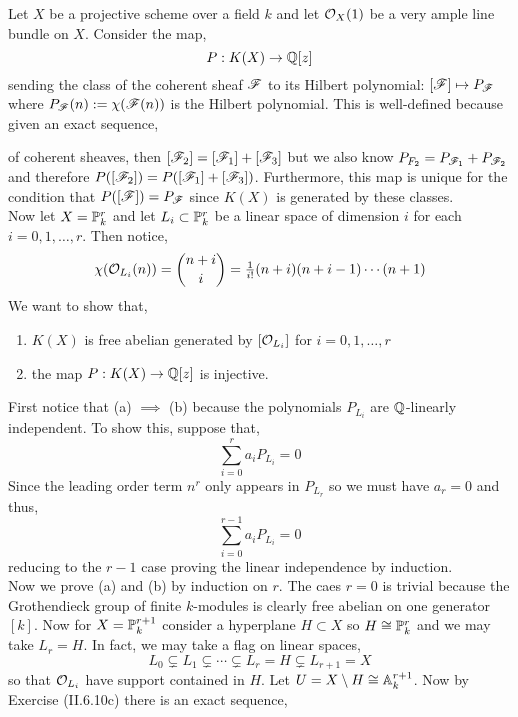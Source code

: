 \documentclass[12pt]{article}
\begin{document}
Let $X$ be a projective scheme over a field $k$ and let $\struct{X}(1)$ be a very ample line bundle on $X$. Consider the map,
\[ P : K(X) \to \Q[z] \]
sending the class of the coherent sheaf $\F$ to its Hilbert polynomial: $[\F] \mapsto P_\F$ where $P_\F(n) := \chi(\F(n))$ is the Hilbert polynomial. This is well-defined because given an exact sequence,
\begin{center}
\end{center}
of coherent sheaves, then $[\F_2] = [\F_1] + [\F_3]$ but we also know $P_{F_2} = P_{\F_1} + P_{\F_2}$ and therefore $P([\F_2]) = P([\F_1] + [\F_3])$. Furthermore, this map is unique for the condition that $P([\F]) = P_\F$ since $K(X)$ is generated by these classes.
\bigskip\\
Now let $X = \P^r_k$ and let $L_i \subset \P^r_k$ be a linear space of dimension $i$ for each $i = 0,1, \dots, r$. Then notice,
\[ \chi(\struct{L_i}(n)) = {n + i \choose i} = \tfrac{1}{i!} (n + i)(n + i - 1) \cdots (n + 1) \]
We want to show that,
\begin{enumerate}
\item $K(X)$ is free abelian generated by $[\struct{L_i}]$ for $i = 0,1,\dots,r$
\item the map $P : K(X) \to \Q[z]$ is injective.
\end{enumerate}
First notice that (a) $\implies$ (b) because the polynomials $P_{L_i}$ are $\Q$-linearly independent. To show this, suppose that,
\[ \sum_{i = 0}^r a_i P_{L_i} = 0 \]
Since the leading order term $n^r$ only appears in $P_{L_r}$ so we must have $a_r = 0$ and thus,
\[ \sum_{i = 0}^{r-1} a_i P_{L_i} = 0 \]
reducing to the $r - 1$ case proving the linear independence by induction. 
\bigskip\\
Now we prove (a) and (b) by induction on $r$. The caes $r = 0$ is trivial because the Grothendieck group of finite $k$-modules is clearly free abelian on one generator $[k]$. Now for $X = \P^{r+1}_k$ consider a hyperplane $H \subset X$ so $H \cong \P^r_k$ and we may take $L_r = H$. In fact, we may take a flag on linear spaces,
\[ L_0 \subsetneq L_1 \subsetneq \cdots \subsetneq L_r = H \subsetneq L_{r+1} = X \] 
so that $\struct{L_i}$ have support contained in $H$.
Let $U = X \setminus H \cong \A^{r+1}_k$. Now by Exercise (II.6.10c) there is an exact sequence,
\begin{center}
\end{center}
\end{document}
